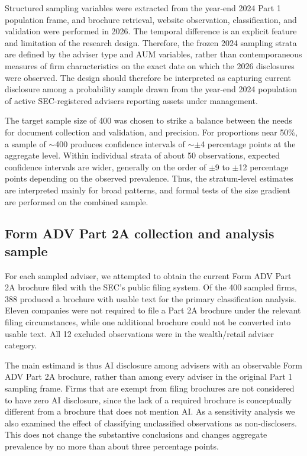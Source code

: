 \documentclass[utf8]{FrontiersinHarvard}
\begin{document}
Structured sampling variables were extracted from the year-end 2024 Part 1 population frame, and brochure retrieval, website observation, classification, and validation were performed in 2026. The temporal difference is an explicit feature and limitation of the research design. Therefore, the frozen 2024 sampling strata are defined by the adviser type and AUM variables, rather than contemporaneous measures of firm characteristics on the exact date on which the 2026 disclosures were observed. The design should therefore be interpreted as capturing current disclosure among a probability sample drawn from the year-end 2024 population of active SEC-registered advisers reporting assets under management.

The target sample size of 400 was chosen to strike a balance between the needs for document collection and validation, and precision. For proportions near 50\%, a sample of $\sim$400 produces confidence intervals of $\sim\pm$4 percentage points at the aggregate level. Within individual strata of about 50 observations, expected confidence intervals are wider, generally on the order of $\pm$9 to $\pm$12 percentage points depending on the observed prevalence. Thus, the stratum-level estimates are interpreted mainly for broad patterns, and formal tests of the size gradient are performed on the combined sample.

\subsection{Form ADV Part 2A collection and analysis sample}

For each sampled adviser, we attempted to obtain the current Form ADV Part 2A brochure filed with the SEC's public filing system. Of the 400 sampled firms, 388 produced a brochure with usable text for the primary classification analysis. Eleven companies were not required to file a Part 2A brochure under the relevant filing circumstances, while one additional brochure could not be converted into usable text. All 12 excluded observations were in the wealth/retail adviser category.

The main estimand is thus AI disclosure among advisers with an observable Form ADV Part 2A brochure, rather than among every adviser in the original Part 1 sampling frame. Firms that are exempt from filing brochures are not considered to have zero AI disclosure, since the lack of a required brochure is conceptually different from a brochure that does not mention AI. As a sensitivity analysis we also examined the effect of classifying unclassified observations as non-disclosers. This does not change the substantive conclusions and changes aggregate prevalence by no more than about three percentage points.
\end{document}
